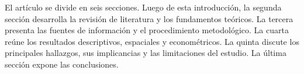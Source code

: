 El artículo se divide en seis secciones. Luego de esta introducción, la segunda
sección desarrolla la revisión de literatura y los fundamentos teóricos. La
tercera presenta las fuentes de información y el procedimiento metodológico.
La cuarta reúne los resultados descriptivos, espaciales y econométricos. La
quinta discute los principales hallazgos, sus implicancias y las limitaciones
del estudio. La última sección expone las conclusiones.
